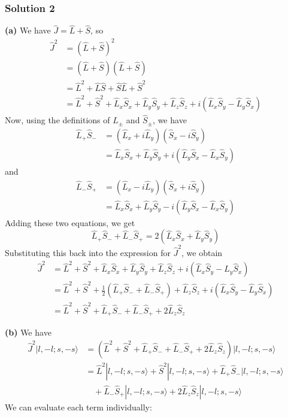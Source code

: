 \documentclass{article}
\begin{document}
\subsubsection{Solution 2}
\textbf{(a)} 
We have $\hat{J} = \hat{L} + \hat{S}$, so
\begin{align*}
\hat{J}^2 &= (\hat{L} + \hat{S})^2 \\
&= (\hat{L} + \hat{S})(\hat{L} + \hat{S}) \\
&= \hat{L}^2 + \hat{L}\hat{S} + \hat{S}\hat{L} + \hat{S}^2 \\
&= \hat{L}^2 + \hat{S}^2 + \hat{L}_x \hat{S}_x + \hat{L}_y \hat{S}_y + \hat{L}_z \hat{S}_z + i(\hat{L}_x \hat{S}_y - \hat{L}_y \hat{S}_x)
\end{align*}
Now, using the definitions of $\hat{L}_\pm$ and $\hat{S}_\pm$, we have
\begin{align*}
\hat{L}_+ \hat{S}_- &= (\hat{L}_x + i \hat{L}_y)(\hat{S}_x - i \hat{S}_y) \\
&= \hat{L}_x \hat{S}_x + \hat{L}_y \hat{S}_y + i(\hat{L}_y \hat{S}_x - \hat{L}_x \hat{S}_y)
\end{align*}
and
\begin{align*}
\hat{L}_- \hat{S}_+ &= (\hat{L}_x - i \hat{L}_y)(\hat{S}_x + i \hat{S}_y) \\
&= \hat{L}_x \hat{S}_x + \hat{L}_y \hat{S}_y - i(\hat{L}_y \hat{S}_x - \hat{L}_x \hat{S}_y)
\end{align*}
Adding these two equations, we get
\[
\hat{L}_+ \hat{S}_- + \hat{L}_- \hat{S}_+ = 2(\hat{L}_x \hat{S}_x + \hat{L}_y \hat{S}_y)
\]
Substituting this back into the expression for $\hat{J}^2$, we obtain
\begin{align*}
\hat{J}^2 &= \hat{L}^2 + \hat{S}^2 + \hat{L}_x \hat{S}_x + \hat{L}_y \hat{S}_y + \hat{L}_z \hat{S}_z + i(\hat{L}_x \hat{S}_y - \hat{L}_y \hat{S}_x) \\
&= \hat{L}^2 + \hat{S}^2 + \frac{1}{2}(\hat{L}_+ \hat{S}_- + \hat{L}_- \hat{S}_+) + \hat{L}_z \hat{S}_z + i(\hat{L}_x \hat{S}_y - \hat{L}_y \hat{S}_x) \\
&= \hat{L}^2 + \hat{S}^2 + \hat{L}_+ \hat{S}_- + \hat{L}_- \hat{S}_+ + 2 \hat{L}_z \hat{S}_z
\end{align*}

\textbf{(b)} 
We have
\begin{align*}
\hat{J}^2 |l, -l; s, -s\rangle &= (\hat{L}^2 + \hat{S}^2 + \hat{L}_+ \hat{S}_- + \hat{L}_- \hat{S}_+ + 2 \hat{L}_z \hat{S}_z) |l, -l; s, -s\rangle \\
&= \hat{L}^2 |l, -l; s, -s\rangle + \hat{S}^2 |l, -l; s, -s\rangle + \hat{L}_+ \hat{S}_- |l, -l; s, -s\rangle \\
&\quad + \hat{L}_- \hat{S}_+ |l, -l; s, -s\rangle + 2 \hat{L}_z \hat{S}_z |l, -l; s, -s\rangle
\end{align*}
We can evaluate each term individually:
\end{document}
